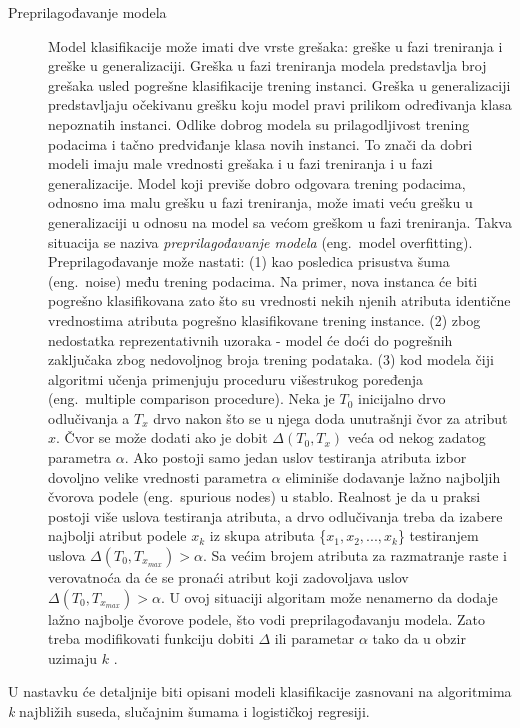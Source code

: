 \documentclass[12pt,oneside]{memoir}
\begin{document}
\begin{description}
\item[Preprilagođavanje modela] Model klasifikacije može imati dve vrste grešaka: greške u fazi treniranja i greške u generalizaciji. Greška u fazi treniranja modela predstavlja broj grešaka usled pogrešne klasifikacije trening instanci. Greška u generalizaciji predstavljaju očekivanu grešku koju model pravi prilikom određivanja klasa nepoznatih instanci. Odlike dobrog modela su prilagodljivost trening podacima i tačno predviđanje klasa novih instanci. To znači da dobri modeli imaju male vrednosti grešaka i u fazi treniranja i u fazi generalizacije. Model koji previše dobro odgovara trening podacima, odnosno ima malu grešku u fazi treniranja, može imati veću grešku u generalizaciji u odnosu na model sa većom greškom u fazi treniranja. Takva situacija se naziva \textit{preprilagođavanje modela} (eng.~model overfitting). Preprilagođavanje može nastati: (1) kao posledica prisustva šuma (eng.~noise) među trening podacima. Na primer, nova instanca će biti pogrešno klasifikovana zato što su vrednosti nekih njenih atributa identične vrednostima atributa pogrešno klasifikovane trening instance. (2) zbog nedostatka reprezentativnih uzoraka - model će doći do pogrešnih zaključaka zbog nedovoljnog broja trening podataka. (3) kod modela čiji algoritmi učenja primenjuju proceduru višestrukog poređenja (eng.~multiple comparison procedure). Neka je $T_0$ inicijalno drvo odlučivanja a $T_x$ drvo nakon što se u njega doda unutrašnji čvor za atribut $x$. Čvor se može dodati ako je dobit $\Delta(T_0, T_x)$ veća od nekog zadatog parametra $\alpha$. Ako postoji samo jedan uslov testiranja atributa izbor dovoljno velike vrednosti parametra $\alpha$ eliminiše dodavanje lažno najboljih čvorova podele (eng.~spurious nodes) u stablo. Realnost je da u praksi postoji više uslova testiranja atributa, a drvo odlučivanja treba da izabere najbolji atribut podele $x_k$ iz skupa atributa \{$x_1, x_2,...,x_k$\} testiranjem uslova $\Delta(T_0, T_{x_{max}})>\alpha$. Sa većim brojem atributa za razmatranje raste i verovatnoća da će se pronaći atribut koji zadovoljava uslov $\Delta(T_0, T_{x_{max}})>\alpha$. U ovoj situaciji algoritam može nenamerno da dodaje lažno najbolje čvorove podele, što vodi preprilagođavanju modela. Zato treba modifikovati funkciju dobiti $\Delta$ ili parametar $\alpha$ tako da u obzir uzimaju $k$  \cite{mitic}.
\end{description}

U nastavku će detaljnije biti opisani modeli klasifikacije zasnovani na algoritmima \textit{k} najbližih suseda, 
slučajnim šumama i logističkoj regresiji.
\end{document}
